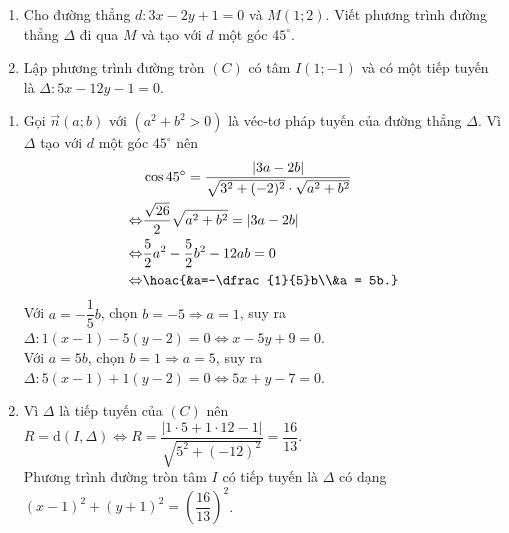 \begin{bt}%
\begin{enumerate}
\item Cho đường thẳng $d\colon3x-2y+1=0$ và $M(1;2)$. Viết phương trình đường thẳng $\Delta$ đi qua $M$ và tạo với $d$ một góc $45^\circ$.
\item Lập phương trình đường tròn $(C)$ có tâm $I(1;-1)$ và có một tiếp tuyến là $\Delta\colon5x-12y-1=0$.
\end{enumerate}
\loigiai
{\begin{enumerate}
\item Gọi $\overrightarrow{n}(a;b)$ với $(a^2+b^2>0)$ là véc-tơ pháp tuyến của đường thẳng $\Delta$.
Vì $\Delta$ tạo với $d$ một góc $45^\circ$ nên 
\begin{align*}
&\cos 45^\circ = \dfrac{|3a-2b|}{\sqrt{3^2+(-2)^2}\cdot\sqrt{a^2+b^2}}\\\Leftrightarrow& \dfrac{\sqrt{26}}{2}\sqrt{a^2+b^2}=|3a-2b|\\\Leftrightarrow&\dfrac{5}{2}a^2-\dfrac{5}{2}b^2-12ab =0\\\Leftrightarrow&\hoac{&a=-\dfrac{1}{5}b\\&a = 5b.}
\end{align*}
Với $a=-\dfrac{1}{5}b$, chọn $b =-5\Rightarrow a = 1$, suy ra $\Delta\colon 1(x-1)-5(y-2)=0\Leftrightarrow x-5y+9=0$.\\
Với $a=5b$, chọn $b =1\Rightarrow a = 5$, suy ra $\Delta\colon 5(x-1)+1(y-2)=0\Leftrightarrow 5x+y-7=0$.\\
\item Vì $\Delta$ là tiếp tuyến của $(C)$ nên $
R = \mathrm{d}(I, \Delta)\Leftrightarrow R = \dfrac{|1\cdot5+1\cdot12-1|}{\sqrt{5^2+(-12)^2}}=\dfrac{16}{13}$.\\
Phương trình đường tròn tâm $I$ có tiếp tuyến là $\Delta$ có dạng $(x-1)^2+(y+1)^2=\left(\dfrac{16}{13}\right)^2$.
\end{enumerate}
}
\end{bt}

